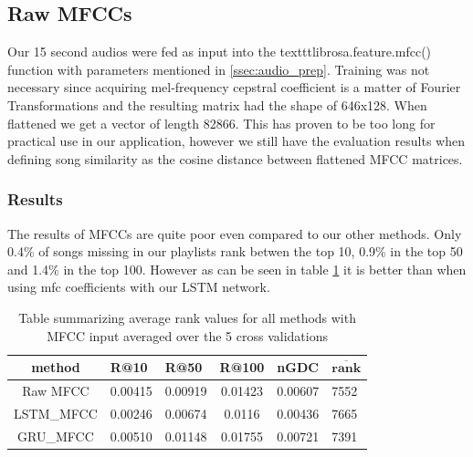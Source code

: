 \subsection{Raw MFCCs}
Our 15 second audios were fed as input into the texttt{librosa.feature.mfcc()} function with parameters mentioned in \ref{ssec:audio_prep}. Training was not necessary since acquiring mel-frequency cepstral coefficient is a matter of Fourier Transformations and the resulting matrix had the shape of 646x128. When flattened we get a vector of length 82866. This has proven to be too long for practical use in our application, however we still have the evaluation results when defining song similarity as the cosine distance between flattened MFCC matrices.

\subsubsection{Results}

The results of MFCCs are quite poor even compared to our other methods. Only 0.4\% of songs missing in our playlists rank betwen the top 10, 0.9\% in the top 50 and 1.4\% in the top 100. However as can be seen in table \ref{table:mfcc_methods} it is better than when using mfc coefficients with our LSTM network.
\begin{table}[h!]
\centering
\renewcommand{\arraystretch}{1.5}
\begin{tabu} to 1\textwidth { | c || X[c] | X[c] | c | X[c] | X[c] |}
 \hline
 \textbf{method} & \textbf{R@10} & \textbf{R@50} & \textbf{R@100} & \textbf{nGDC} & $ \boldsymbol{\overline{rank}} $ \\
 \hline
 \hline
 Raw MFCC & 0.00415 & 0.00919 & 0.01423 & 0.00607 &  7552 \\
 \hline
 LSTM\_MFCC & 0.00246 & 0.00674 & 0.0116 & 0.00436 & 7665 \\
 \hline
 GRU\_MFCC & 0.00510 & 0.01148 & 0.01755 & 0.00721 & 7391 \\
 \hline
\end{tabu} \\

\caption{Table summarizing average rank values for all methods with MFCC input averaged over the 5 cross validations}
\label{table:mfcc_methods}
\end{table}

